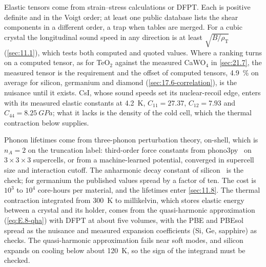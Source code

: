 Elastic tensors come from strain--stress calculations or DFPT. Each is positive definite and in the Voigt order; at least one public database lists the shear components in a different order, a trap when tables are merged. For a cubic crystal the longitudinal sound speed in any direction is at least $\sqrt{B/\rho_{\mathrm{T}}}$ (\cref{sec:11.1}), which tests both computed and quoted values. Where a ranking turns on a computed tensor, as for TeO$_2$ against the measured CaWO$_4$ in \cref{sec:21.7}, the measured tensor is the requirement and the offset of computed tensors, \SI{4.9}{\percent} on average for silicon, germanium and diamond (\cref{sec:17.6-correlation}), is the nuisance until it exists. CsI, whose sound speeds set its nuclear-recoil edge, enters with its measured elastic constants at \SI{4.2}{K}, $C_{11} = 27.37$, $C_{12} = 7.93$ and $C_{44} = \SI{8.25}{GPa}$; what it lacks is the density of the cold cell, which the thermal contraction below supplies.

Phonon lifetimes come from three-phonon perturbation theory, on-shell, which is $n_A = 2$ on the truncation label: third-order force constants from phono3py~\cite{togo2015distributions} on $3\times3\times3$ supercells, or from a machine-learned potential, converged in supercell size and interaction cutoff. The anharmonic decay constant of silicon~\cite{tamura1985spontaneous} is the check; for germanium the published values spread by a factor of ten. The cost is $10^3$ to $10^4$ core-hours per material, and the lifetimes enter \cref{sec:11.8}. The thermal contraction integrated from \SI{300}{K} to millikelvin, which stores elastic energy between a crystal and its holder, comes from the quasi-harmonic approximation (\cref{eq:E.8-qha}) with DFPT at about five volumes, with the PBE and PBEsol spread as the nuisance and measured expansion coefficients (Si, Ge, sapphire) as checks. The quasi-harmonic approximation fails near soft modes, and silicon expands on cooling below about \SI{120}{K}, so the sign of the integrand must be checked.
